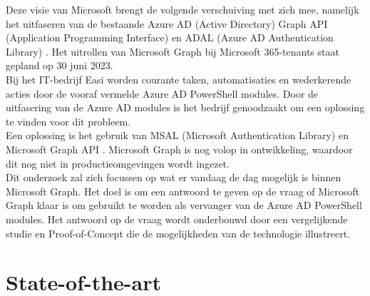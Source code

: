 Deze visie van Microsoft brengt de volgende verschuiving met zich mee, namelijk het uitfaseren van de bestaande Azure AD (Active Directory) Graph API (Application Programming Interface) en ADAL (Azure AD Authentication Library) \autocite{Sahay2022}. Het uitrollen van Microsoft Graph bij Microsoft 365-tenants staat gepland op 30 juni 2023. \\

Bij het IT-bedrijf Easi worden courante taken, automatisaties en wederkerende acties door de vooraf vermelde Azure AD PowerShell modules. Door de uitfasering van de Azure AD modules is het bedrijf genoodzaakt om een oplossing te vinden voor dit probleem. \\

Een oplossing is het gebruik van MSAL (Microsoft Authentication Library) en Microsoft Graph API \autocite{Microsoft2023Va}. Microsoft Graph is nog volop in ontwikkeling, waardoor dit nog niet in productieomgevingen wordt ingezet. \\

Dit onderzoek zal zich focussen op wat er vandaag de dag mogelijk is binnen Microsoft Graph. Het doel is om een antwoord te geven op de vraag of Microsoft Graph klaar is om gebruikt te worden als vervanger van de Azure AD PowerShell modules. Het antwoord op de vraag wordt onderbouwd door een vergelijkende studie en Proof-of-Concept die de mogelijkheden van de technologie illustreert.



\section{State-of-the-art}%
\label{sec:state-of-the-art}

